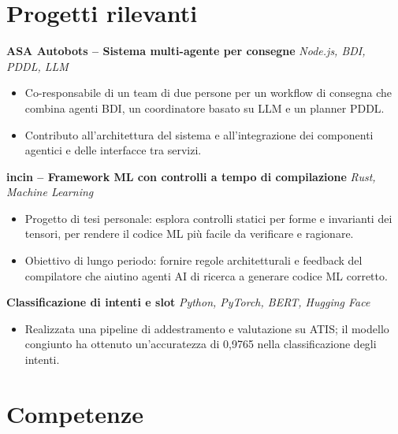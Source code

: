 \documentclass[10pt,a4paper]{article}
\begin{document}
\section{Progetti rilevanti}
\noindent\textbf{ASA Autobots -- Sistema multi-agente per consegne} \hfill \textsl{Node.js, BDI, PDDL, LLM}\\
\begin{itemize}
  \item Co-responsabile di un team di due persone per un workflow di consegna che combina agenti BDI, un coordinatore basato su LLM e un planner PDDL.
  \item Contributo all'architettura del sistema e all'integrazione dei componenti agentici e delle interfacce tra servizi.
\end{itemize}

\noindent\textbf{incin -- Framework ML con controlli a tempo di compilazione} \hfill \textsl{Rust, Machine Learning}\\
\begin{itemize}
  \item Progetto di tesi personale: esplora controlli statici per forme e invarianti dei tensori, per rendere il codice ML più facile da verificare e ragionare.
  \item Obiettivo di lungo periodo: fornire regole architetturali e feedback del compilatore che aiutino agenti AI di ricerca a generare codice ML corretto.
\end{itemize}

\noindent\textbf{Classificazione di intenti e slot} \hfill \textsl{Python, PyTorch, BERT, Hugging Face}\\
\begin{itemize}
  \item Realizzata una pipeline di addestramento e valutazione su ATIS; il modello congiunto ha ottenuto un'accuratezza di 0,9765 nella classificazione degli intenti.
\end{itemize}

\section{Competenze}
\end{document}
